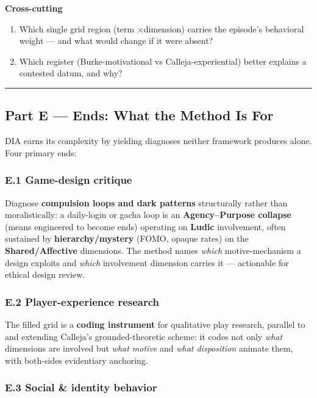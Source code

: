 \documentclass[11pt]{report}
\begin{document}
\textbf{Cross-cutting}

\begin{enumerate}
\item Which single grid region (term $\times$\allowbreak  dimension) carries the episode's behavioral weight — and what would change if it were absent?
\item Which register (Burke-motivational vs Calleja-experiential) better explains a contested datum, and why?
\end{enumerate}


\vspace{0.4em}\hrule\vspace{0.8em}


\subsection{Part E — Ends: What the Method Is For}


DIA earns its complexity by yielding diagnoses neither framework produces alone. Four primary ends:


\subsubsection{E.1 Game-design critique}

Diagnose \textbf{compulsion loops and dark patterns} structurally rather than moralistically: a daily-login or gacha loop is an \textbf{Agency–Purpose collapse} (means engineered to become ends) operating on \textbf{Ludic} involvement, often sustained by \textbf{hierarchy/mystery} (FOMO, opaque rates) on the \textbf{Shared/Affective} dimensions. The method names \textit{which} motive-mechanism a design exploits and \textit{which} involvement dimension carries it — actionable for ethical design review.


\subsubsection{E.2 Player-experience research}

The filled grid is a \textbf{coding instrument} for qualitative play research, parallel to and extending Calleja's grounded-theoretic scheme: it codes not only \textit{what} dimensions are involved but \textit{what motive} and \textit{what disposition} animate them, with both-sides evidentiary anchoring.


\subsubsection{E.3 Social \& identity behavior}
\end{document}
